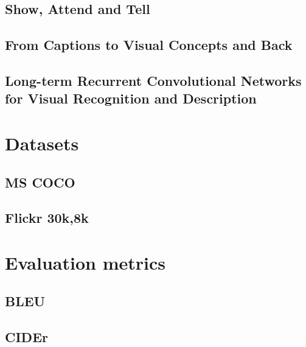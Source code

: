 		\subsection{Show, Attend and Tell}
		\cite{DBLP:journals/corr/XuBKCCSZB15}
		
		
		\subsection{From Captions to Visual Concepts and Back}
		\cite{DBLP:journals/corr/FangGISDDGHMPZZ14}
		
		
		\subsection{Long-term Recurrent Convolutional Networks for Visual Recognition and Description}
		\cite{DBLP:journals/corr/DonahueHGRVSD14}


	\section{Datasets}
	
		\subsection{MS COCO}
		
		\subsection{Flickr 30k,8k}

	\section{Evaluation metrics}
		\subsection{BLEU}
		\cite{Papineni:2002:BMA:1073083.1073135}
		
		\subsection{CIDEr}
		\cite{DBLP:journals/corr/VedantamZP14a}
		
